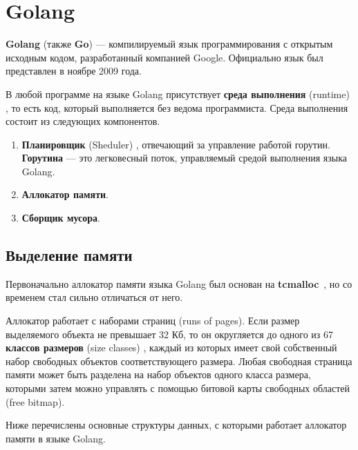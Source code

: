 \section{Golang}

\textbf{Golang} (также \textbf{Go}) \cite{golang} --- компилируемый язык программирования с открытым исходным кодом, разработанный компанией Google. Официально язык был представлен в ноябре 2009 года.

В любой программе на языке Golang присутствует \textbf{среда выполнения} (runtime) \cite{golang_runtime}, то есть код, который выполняется без ведома программиста. Среда выполнения состоит из следующих компонентов.

\begin{enumerate}[label*=\arabic*.]
	\item \textbf{Планировщик} (Sheduler) \cite{golang_scheduler}, отвечающий за управление работой горутин. \textbf{Горутина} --- это легковесный поток, управляемый средой выполнения языка Golang. \cite{golang_goroutine}
	\item \textbf{Аллокатор памяти}.
	\item \textbf{Сборщик мусора}.
\end{enumerate}

\subsection{Выделение памяти}

Первоначально аллокатор памяти языка Golang был основан на \textbf{tcmalloc}~\cite{tcmalloc}, но со временем стал сильно отличаться от него. \cite{golang_malloc} 

Аллокатор работает с наборами страниц (runs of pages). Если размер выделяемого объекта не превышает 32 Кб, то он округляется до одного из 67 \textbf{классов размеров} (size classes) \cite{golang_size_classes}, каждый из которых имеет свой собственный набор свободных объектов соответствующего размера. Любая свободная страница памяти может быть разделена на набор объектов одного класса размера, которыми затем можно управлять с помощью битовой карты свободных областей (free bitmap). \cite{golang_malloc}

Ниже перечислены основные структуры данных, с которыми работает аллокатор памяти в языке Golang. \cite{golang_malloc}

